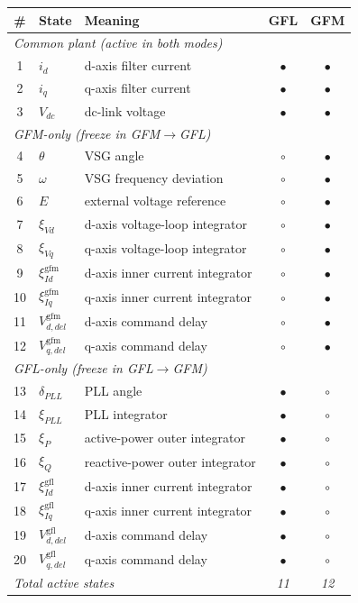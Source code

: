 \documentclass[12pt,a4paper]{article}
\begin{document}
\begin{center}
\small
{}
\label{tab:ibr-states-en}
\begin{tabular}{@{}c l l c c@{}}
\toprule
\# & State & Meaning & GFL & GFM \\
\midrule
\multicolumn{5}{l}{\textit{Common plant (active in both modes)}}\\
1 & $i_d$ & d-axis filter current & $\bullet$ & $\bullet$ \\
2 & $i_q$ & q-axis filter current & $\bullet$ & $\bullet$ \\
3 & $V_{dc}$ & dc-link voltage & $\bullet$ & $\bullet$ \\
\midrule
\multicolumn{5}{l}{\textit{GFM-only (freeze in GFM$\to$GFL)}}\\
4 & $\theta$ & VSG angle & $\circ$ & $\bullet$ \\
5 & $\omega$ & VSG frequency deviation & $\circ$ & $\bullet$ \\
6 & $E$ & external voltage reference & $\circ$ & $\bullet$ \\
7 & $\xi_{Vd}$ & d-axis voltage-loop integrator & $\circ$ & $\bullet$ \\
8 & $\xi_{Vq}$ & q-axis voltage-loop integrator & $\circ$ & $\bullet$ \\
9 & $\xi_{Id}^{\mathrm{gfm}}$ & d-axis inner current integrator & $\circ$ & $\bullet$ \\
10 & $\xi_{Iq}^{\mathrm{gfm}}$ & q-axis inner current integrator & $\circ$ & $\bullet$ \\
11 & $V_{d,del}^{\mathrm{gfm}}$ & d-axis command delay & $\circ$ & $\bullet$ \\
12 & $V_{q,del}^{\mathrm{gfm}}$ & q-axis command delay & $\circ$ & $\bullet$ \\
\midrule
\multicolumn{5}{l}{\textit{GFL-only (freeze in GFL$\to$GFM)}}\\
13 & $\delta_{PLL}$ & PLL angle & $\bullet$ & $\circ$ \\
14 & $\xi_{PLL}$ & PLL integrator & $\bullet$ & $\circ$ \\
15 & $\xi_{P}$ & active-power outer integrator & $\bullet$ & $\circ$ \\
16 & $\xi_{Q}$ & reactive-power outer integrator & $\bullet$ & $\circ$ \\
17 & $\xi_{Id}^{\mathrm{gfl}}$ & d-axis inner current integrator & $\bullet$ & $\circ$ \\
18 & $\xi_{Iq}^{\mathrm{gfl}}$ & q-axis inner current integrator & $\bullet$ & $\circ$ \\
19 & $V_{d,del}^{\mathrm{gfl}}$ & d-axis command delay & $\bullet$ & $\circ$ \\
20 & $V_{q,del}^{\mathrm{gfl}}$ & q-axis command delay & $\bullet$ & $\circ$ \\
\midrule
\multicolumn{3}{l}{\textit{Total active states}} & \textit{11} & \textit{12} \\
\bottomrule
\end{tabular}
\end{center}
\end{document}
